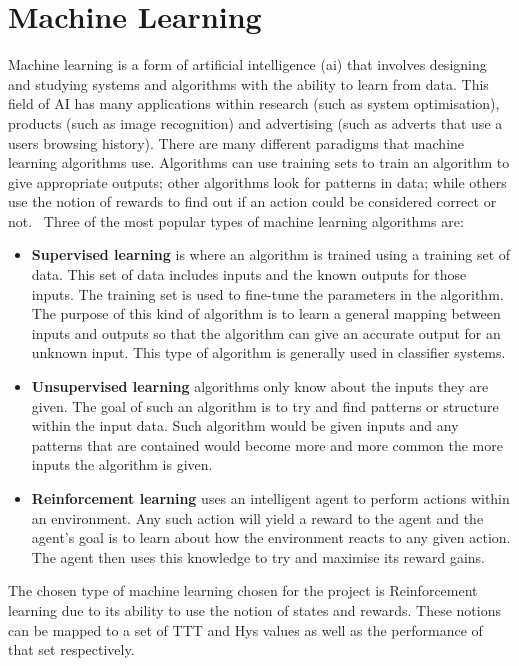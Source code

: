 \chapter{Machine Learning}\label{machine learning}
Machine learning is a form of artificial intelligence (\ac{ai}) that involves designing and studying systems and algorithms with the ability to learn from data. This field of AI has many applications within research (such as system optimisation), products (such as image recognition) and advertising (such as adverts that use a users browsing history). There are many different paradigms that machine learning algorithms use. Algorithms can use training sets to train an algorithm to give appropriate outputs; other algorithms look for patterns in data; while others use the notion of rewards to find out if an action could be considered correct or not.~\cite{alpaydin2010introduction} Three of the most popular types of machine learning algorithms are:

\begin{itemize}
  \item \textbf{Supervised learning} is where an algorithm is trained using a training set of data. This set of data includes inputs and the known outputs for those inputs. The training set is used to fine-tune the parameters in the algorithm. The purpose of this kind of algorithm is to learn a general mapping between inputs and outputs so that the algorithm can give an accurate output for an unknown input. This type of algorithm is generally used in classifier systems.
  \item \textbf{Unsupervised learning} algorithms only know about the inputs they are given. The goal of such an algorithm is to try and find patterns or structure within the input data. Such algorithm would be given inputs and any patterns that are contained would become more and more common the more inputs the algorithm is given.
  \item \textbf{Reinforcement learning} uses an intelligent agent to perform actions within an environment. Any such action will yield a reward to the agent and the agent’s goal is to learn about how the environment reacts to any given action. The agent then uses this knowledge to try and maximise its reward gains.
\end{itemize}

The chosen type of machine learning chosen for the project is Reinforcement learning due to its ability to use the notion of states and rewards. These notions can be mapped to a set of TTT and Hys values as well as the performance of that set respectively.

